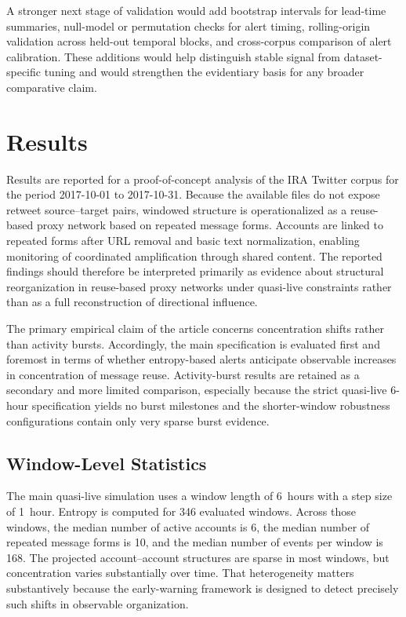 \documentclass[sigconf]{acmart}
\begin{document}
A stronger next stage of validation would add bootstrap intervals for lead-time summaries, null-model or permutation checks for alert timing, rolling-origin validation across held-out temporal blocks, and cross-corpus comparison of alert calibration. These additions would help distinguish stable signal from dataset-specific tuning and would strengthen the evidentiary basis for any broader comparative claim.

\section{Results}
\label{sec:results}

Results are reported for a proof-of-concept analysis of the IRA Twitter corpus for the period 2017-10-01 to 2017-10-31. Because the available files do not expose retweet source--target pairs, windowed structure is operationalized as a reuse-based proxy network based on repeated message forms. Accounts are linked to repeated forms after URL removal and basic text normalization, enabling monitoring of coordinated amplification through shared content. The reported findings should therefore be interpreted primarily as evidence about structural reorganization in reuse-based proxy networks under quasi-live constraints rather than as a full reconstruction of directional influence.

The primary empirical claim of the article concerns concentration shifts rather than activity bursts. Accordingly, the main specification is evaluated first and foremost in terms of whether entropy-based alerts anticipate observable increases in concentration of message reuse. Activity-burst results are retained as a secondary and more limited comparison, especially because the strict quasi-live 6-hour specification yields no burst milestones and the shorter-window robustness configurations contain only very sparse burst evidence.

\subsection{Window-Level Statistics}

The main quasi-live simulation uses a window length of 6~hours with a step size of 1~hour. Entropy is computed for 346 evaluated windows. Across those windows, the median number of active accounts is 6, the median number of repeated message forms is 10, and the median number of events per window is 168. The projected account--account structures are sparse in most windows, but concentration varies substantially over time. That heterogeneity matters substantively because the early-warning framework is designed to detect precisely such shifts in observable organization.
\end{document}
